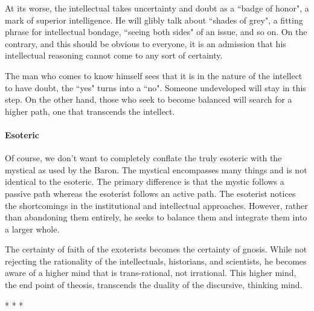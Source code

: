At its worse, the intellectual takes uncertainty and doubt as a ``badge of honor", a mark of superior intelligence. He will glibly talk about ``shades of grey", a fitting phrase for intellectual bondage, ``seeing both sides" of an issue, and so on. On the contrary, and this should be obvious to everyone, it is an admission that his intellectual reasoning cannot come to any sort of certainty.

The man who comes to know himself sees that it is in the nature of the intellect to have doubt, the ``yes" turns into a ``no". Someone undeveloped will stay in this step. On the other hand, those who seek to become balanced will search for a higher path, one that transcends the intellect.

\paragraph{Esoteric}
Of course, we don't want to completely conflate the truly esoteric with the mystical as used by the Baron. The mystical encompasses many things and is not identical to the esoteric. The primary difference is that the mystic follows a passive path whereas the esoterist follows an active path. The esoterist notices the shortcomings in the institutional and intellectual approaches. However, rather than abandoning them entirely, he seeks to balance them and integrate them into a larger whole.

The certainty of faith of the exoterists becomes the certainty of gnosis. While not rejecting the rationality of the intellectuals, historians, and scientists, he becomes aware of a higher mind that is trans-rational, not irrational. This higher mind, the end point of theosis, transcends the duality of the discursive, thinking mind.




\begin{center}* * *\end{center}

